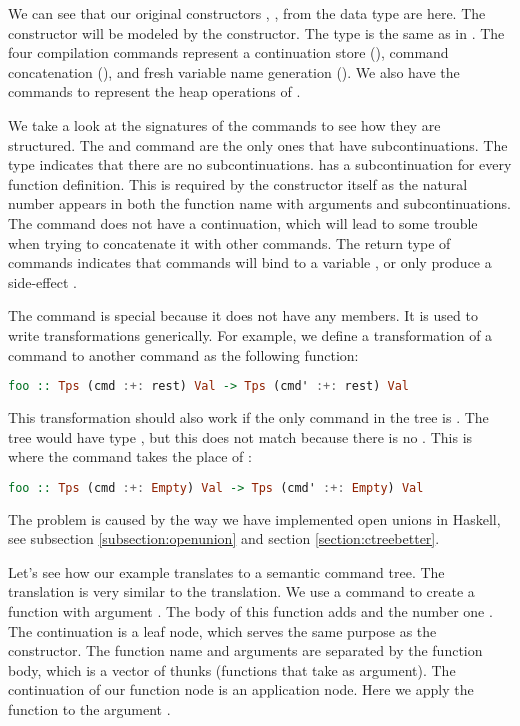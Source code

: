 We can see that our original constructors , ,  from the  data type are here. The  constructor will be modeled by the  constructor. The  type is the same as in . The four compilation commands represent a continuation store (), command concatenation (), and fresh variable name generation (). We also have the  commands to represent the heap operations of .

We take a look at the signatures of the commands to see how they are structured. The  and  command are the only ones that have subcontinuations. The  type indicates that there are no subcontinuations.  has a subcontinuation for every function definition. This is required by the constructor itself as the natural number  appears in both the function name with arguments and subcontinuations. The  command does not have a continuation, which will lead to some trouble when trying to concatenate it with other commands. The return type of commands indicates that commands will bind to a variable , or only produce a side-effect \icode{()}.

The  command is special because it does not have any members. It is used to write transformations generically. For example, we define a transformation of a command to another command as the following function:

\begin{lstlisting}[language=Haskell]
foo :: Tps (cmd :+: rest) Val -> Tps (cmd' :+: rest) Val
\end{lstlisting}

This transformation should also work if the only command in the tree is . The tree would have type , but this does not match because there is no . This is where the  command takes the place of :

\begin{lstlisting}[language=Haskell]
foo :: Tps (cmd :+: Empty) Val -> Tps (cmd' :+: Empty) Val
\end{lstlisting}

The  problem is caused by the way we have implemented open unions in Haskell, see subsection \ref{subsection:openunion} and section \ref{section:ctreebetter}.

Let's see how our example  translates to a semantic command tree. The translation is very similar to the  translation. We use a  command to create a function  with argument . The body of this function adds  and the number one . The continuation is a leaf node, which serves the same purpose as the  constructor. The function name and arguments are separated by the function body, which is a vector of thunks (functions that take \icode{()} as argument). The continuation of our function node is an application node. Here we apply the function  to the argument .
  
